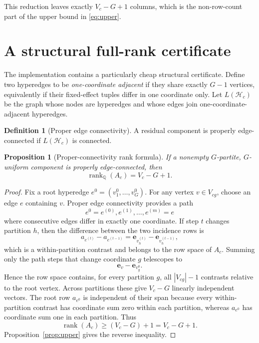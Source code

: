 \documentclass[11pt]{article}
\newtheorem{proposition}[theorem]{Proposition}
\theoremstyle{definition}
\newtheorem{definition}[theorem]{Definition}
\newcommand{\Q}{\mathbb{Q}}
\newcommand{\rank}{\operatorname{rank}}
\newcommand{\1}{\mathbf{1}}
\newcommand{\HH}{\mathcal{H}}
\begin{document}
This reduction leaves exactly $V_c-G+1$ columns, which is the non-row-count part of the upper bound in \eqref{eq:upper}.

\section{A structural full-rank certificate}

The implementation contains a particularly cheap structural certificate. Define two hyperedges to be \emph{one-coordinate adjacent} if they share exactly $G-1$ vertices, equivalently if their fixed-effect tuples differ in one coordinate only. Let $L(\HH_c)$ be the graph whose nodes are hyperedges and whose edges join one-coordinate-adjacent hyperedges.

\begin{definition}[Proper edge connectivity]
A residual component is properly edge-connected if $L(\HH_c)$ is connected.
\end{definition}

\begin{proposition}[Proper-connectivity rank formula]\label{prop:proper}
If a nonempty $G$-partite, $G$-uniform component is properly edge-connected, then
\begin{equation}
  \rank_{\Q}(A_c)=V_c-G+1.
  \label{eq:properrank}
\end{equation}
\end{proposition}

\begin{proof}
Fix a root hyperedge $e^0=(v^0_1,\ldots,v^0_G)$. For any vertex $v\in V_{cg}$, choose an edge $e$ containing $v$. Proper edge connectivity provides a path
\begin{equation}
  e^0=e^{(0)},e^{(1)},\ldots,e^{(m)}=e
\end{equation}
where consecutive edges differ in exactly one coordinate. If step $t$ changes partition $h$, then the difference between the two incidence rows is
\begin{equation}
  a_{e^{(t)}}-a_{e^{(t-1)}}=\mathbf e_{v^{(t)}_h}-\mathbf e_{v^{(t-1)}_h},
\end{equation}
which is a within-partition contrast and belongs to the row space of $A_c$. Summing only the path steps that change coordinate $g$ telescopes to
\begin{equation}
  \mathbf e_v-\mathbf e_{v^0_g}.
\end{equation}
Hence the row space contains, for every partition $g$, all $|V_{cg}|-1$ contrasts relative to the root vertex. Across partitions these give $V_c-G$ linearly independent vectors. The root row $a_{e^0}$ is independent of their span because every within-partition contrast has coordinate sum zero within each partition, whereas $a_{e^0}$ has coordinate sum one in each partition. Thus
\begin{equation}
  \rank(A_c)\ge (V_c-G)+1=V_c-G+1.
\end{equation}
Proposition~\ref{prop:upper} gives the reverse inequality.
\end{proof}
\end{document}
